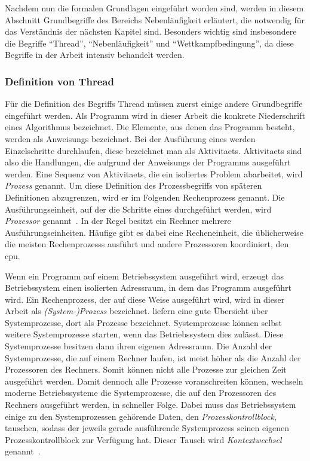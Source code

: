 Nachdem nun die formalen Grundlagen eingeführt worden sind, werden in diesem Abschnitt Grundbegriffe des Bereichs Nebenläufigkeit erläutert, die notwendig für das Verständnis der nächsten Kapitel sind. Besonders wichtig sind insbesondere die Begriffe \enquote{Thread}, \enquote{Nebenläufigkeit} und \enquote{Wettkampfbedingung}, da diese Begriffe in der Arbeit intensiv behandelt werden.


\subsubsection{Definition von Thread}
Für die Definition des Begriffs Thread müssen zuerst einige andere Grundbegriffe eingeführt werden. 
Als \gls{Programm} wird in dieser Arbeit die konkrete Niederschrift eines Algorithmus bezeichnet. Die Elemente, aus denen das \gls{Programm} besteht, werden als \glspl{Anweisung} bezeichnet. Bei der Ausführung eines  werden Einzelschritte durchlaufen, diese bezeichnet man als \glspl{Aktivitaet}. \glspl{Aktivitaet} sind also die Handlungen, die aufgrund der \glspl{Anweisung} der Programms ausgeführt werden. Eine Sequenz von \glspl{Aktivitaet}, die ein isoliertes Problem abarbeitet, wird \emph{Prozess} genannt. Um diese Definition des Prozessbegriffs von späteren Definitionen abzugrenzen, wird er im Folgenden \gls{Rechenprozess} genannt. Die Ausführungseinheit, auf der die Schritte eines  durchgeführt werden, wird \emph{Prozessor} genannt~\cite[S.~22]{Herrtwich1989}. In der Regel besitzt ein Rechner mehrere Ausführungseinheiten. Häufige gibt es dabei eine Recheneinheit, die üblicherweise die meisten \glspl{Rechenprozess} ausführt und andere Prozessoren koordiniert, den \ac{cpu}.

Wenn ein \gls{Programm} auf einem Betriebssystem ausgeführt wird, erzeugt das Betriebssystem einen isolierten Adressraum, in dem das \gls{Programm} ausgeführt wird. Ein \gls{Rechenprozess}, der auf diese Weise ausgeführt wird, wird in dieser Arbeit als \emph{(System-)Prozess} bezeichnet. \textcite[S.~125~\psqq]{Tanenbaum2016} liefern eine gute Übersicht über Systemprozesse, dort als Prozesse bezeichnet. Systemprozesse können selbst weitere Systemprozesse starten, wenn das Betriebssystem dies zulässt. Diese Systemprozesse besitzen dann ihren eigenen Adressraum. Die Anzahl der Systemprozesse, die auf einem Rechner laufen, ist meist höher als die Anzahl der Prozessoren des Rechners. Somit können nicht alle Prozesse zur gleichen Zeit ausgeführt werden. Damit dennoch alle Prozesse voranschreiten können, wechseln moderne Betriebssysteme die Systemprozesse, die auf den Prozessoren des Rechners ausgeführt werden, in schneller Folge. Dabei muss das Betriebssystem einige zu den Systemprozessen gehörende Daten, den \emph{Prozesskontrollblock}, tauschen, sodass der jeweils gerade ausführende Systemprozess seinen eigenen Prozesskontrollblock zur Verfügung hat. Dieser Tausch wird \emph{Kontextwechsel} genannt~\cite[S.~59]{Tanenbaum2016}.

